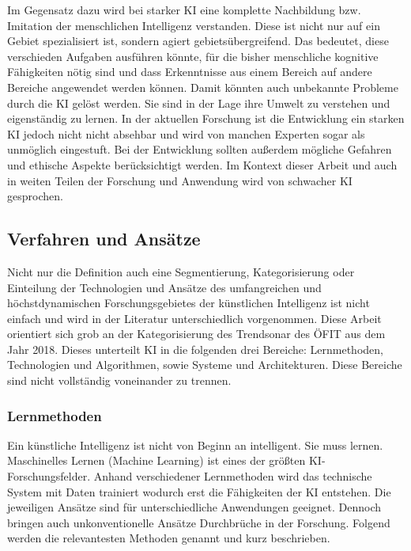 \documentclass[a4paper,12pt, german]{report}
\begin{document}
Im Gegensatz dazu wird bei starker KI eine komplette Nachbildung bzw. Imitation der menschlichen Intelligenz verstanden. Diese ist nicht nur auf ein Gebiet spezialisiert ist, sondern agiert gebietsübergreifend. Das bedeutet, diese verschieden Aufgaben ausführen könnte, für die bisher menschliche kognitive Fähigkeiten nötig sind und dass Erkenntnisse aus einem Bereich auf andere Bereiche angewendet werden können. Damit könnten auch unbekannte Probleme durch die KI gelöst werden. Sie sind in der Lage ihre Umwelt zu verstehen und eigenständig zu lernen. In der aktuellen Forschung ist die Entwicklung ein starken KI jedoch nicht nicht absehbar und wird von manchen Experten sogar als unmöglich eingestuft. Bei der Entwicklung sollten außerdem mögliche Gefahren und ethische Aspekte berücksichtigt werden. 
Im Kontext dieser Arbeit und auch in weiten Teilen der Forschung und Anwendung wird von schwacher KI gesprochen. \cite{01}\cite{15}

\subsection{Verfahren und Ansätze}

Nicht nur die Definition auch eine Segmentierung, Kategorisierung oder Einteilung der Technologien und Ansätze des umfangreichen und höchstdynamischen Forschungsgebietes der künstlichen Intelligenz ist nicht einfach und wird in der Literatur unterschiedlich vorgenommen. Diese Arbeit orientiert sich grob an der Kategorisierung des Trendsonar des ÖFIT aus dem Jahr 2018. Dieses unterteilt KI in die folgenden drei Bereiche: Lernmethoden, Technologien und Algorithmen, sowie Systeme und Architekturen. \cite{10}
Diese Bereiche sind nicht vollständig voneinander zu trennen.  

\subsubsection{Lernmethoden}
Ein künstliche Intelligenz ist nicht von Beginn an intelligent. Sie muss lernen. Maschinelles Lernen (Machine Learning) ist eines der größten KI-Forschungsfelder. Anhand verschiedener Lernmethoden wird das technische System mit Daten trainiert wodurch erst die Fähigkeiten der KI entstehen. Die jeweiligen Ansätze sind für unterschiedliche Anwendungen geeignet. Dennoch bringen auch unkonventionelle Ansätze Durchbrüche in der Forschung. Folgend werden die relevantesten Methoden genannt und kurz beschrieben. \cite{10}
\end{document}
